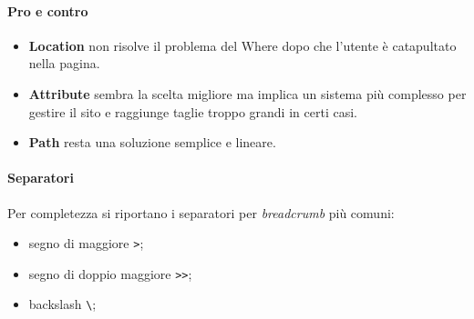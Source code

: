 				\paragraph{Pro e contro}
					\begin{itemize}
						\item \textbf{Location} non risolve il problema del Where dopo che l'utente è catapultato nella pagina.
						\item \textbf{Attribute} sembra la scelta migliore ma implica un sistema più complesso per gestire il sito e raggiunge taglie troppo grandi in certi casi.
						\item \textbf{Path} resta una soluzione semplice e lineare.
					\end{itemize}
				
				\paragraph{Separatori}
					Per completezza si riportano i separatori per \emph{breadcrumb} più comuni:
					\begin{itemize}
						\item segno di maggiore \verb|>|;
						\item segno di doppio maggiore \verb|>>|;
						\item backslash \verb|\|;
					\end{itemize}
				